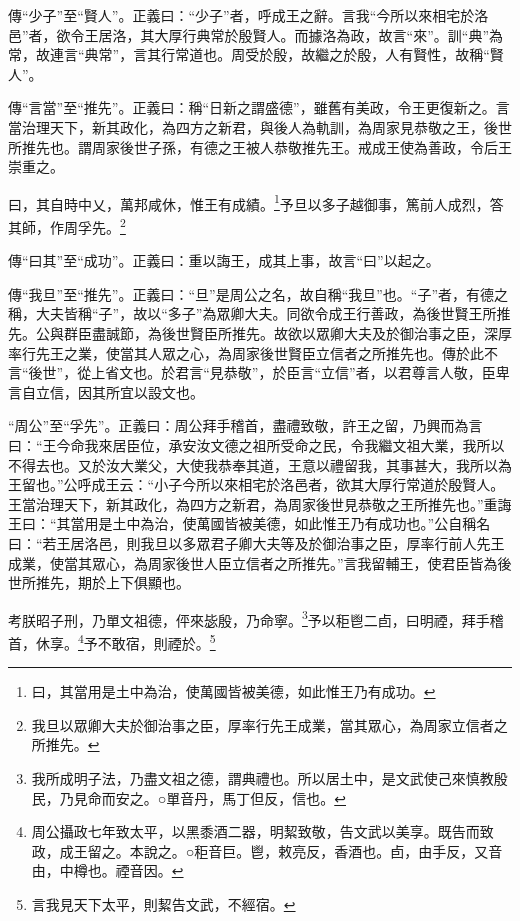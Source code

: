 {\noindent\zhuan{}\fzbyks 傳“少子”至“賢人”。正義曰：“少子”者，呼成王之辭。言我“今所以來相宅於洛邑”者，欲令王居洛，其大厚行典常於殷賢人。而據洛為政，故言“來”。訓“典”為常，故連言“典常”，言其行常道也。周受於殷，故繼之於殷，人有賢性，故稱“賢人”。 \par}

{\noindent\zhuan{}\fzbyks 傳“言當”至“推先”。正義曰：稱“日新之謂盛德”，雖舊有美政，令王更復新之。言當治理天下，新其政化，為四方之新君，與後人為軌訓，為周家見恭敬之王，後世所推先也。謂周家後世子孫，有德之王被人恭敬推先王。戒成王使為善政，令后王崇重之。 \par}

曰，其自時中乂，萬邦咸休，惟王有成績。\footnote{曰，其當用是土中為治，使萬國皆被美德，如此惟王乃有成功。}予旦以多子越御事，篤前人成烈，答其師，作周孚先。\footnote{我旦以眾卿大夫於御治事之臣，厚率行先王成業，當其眾心，為周家立信者之所推先。}

{\noindent\zhuan{}\fzbyks 傳“曰其”至“成功”。正義曰：重以誨王，成其上事，故言“曰”以起之。 \par}

{\noindent\zhuan{}\fzbyks 傳“我旦”至“推先”。正義曰：“旦”是周公之名，故自稱“我旦”也。“子”者，有德之稱，大夫皆稱“子”，故以“多子”為眾卿大夫。同欲令成王行善政，為後世賢王所推先。公與群臣盡誠節，為後世賢臣所推先。故欲以眾卿大夫及於御治事之臣，深厚率行先王之業，使當其人眾之心，為周家後世賢臣立信者之所推先也。傳於此不言“後世”，從上省文也。於君言“見恭敬”，於臣言“立信”者，以君尊言人敬，臣卑言自立信，因其所宜以設文也。 \par}

{\noindent\shu{}\fzkt “周公”至“孚先”。正義曰：周公拜手稽首，盡禮致敬，許王之留，乃興而為言曰：“王今命我來居臣位，承安汝文德之祖所受命之民，令我繼文祖大業，我所以不得去也。又於汝大業父，大使我恭奉其道，王意以禮留我，其事甚大，我所以為王留也。”公呼成王云：“小子今所以來相宅於洛邑者，欲其大厚行常道於殷賢人。王當治理天下，新其政化，為四方之新君，為周家後世見恭敬之王所推先也。”重誨王曰：“其當用是土中為治，使萬國皆被美德，如此惟王乃有成功也。”公自稱名曰：“若王居洛邑，則我旦以多眾君子卿大夫等及於御治事之臣，厚率行前人先王成業，使當其眾心，為周家後世人臣立信者之所推先。”言我留輔王，使君臣皆為後世所推先，期於上下俱顯也。 \par}

考朕昭子刑，乃單文祖德，伻來毖殷，乃命寧。\footnote{我所成明子法，乃盡文祖之德，謂典禮也。所以居土中，是文武使己來慎教殷民，乃見命而安之。○單音丹，馬丁但反，信也。}予以秬鬯二卣，曰明禋，拜手稽首，休享。\footnote{周公攝政七年致太平，以黑黍酒二器，明絜致敬，告文武以美享。既告而致政，成王留之。本說之。○秬音巨。鬯，敕亮反，香酒也。卣，由手反，又音由，中樽也。禋音因。}予不敢宿，則禋於。\footnote{言我見天下太平，則絜告文武，不經宿。}


